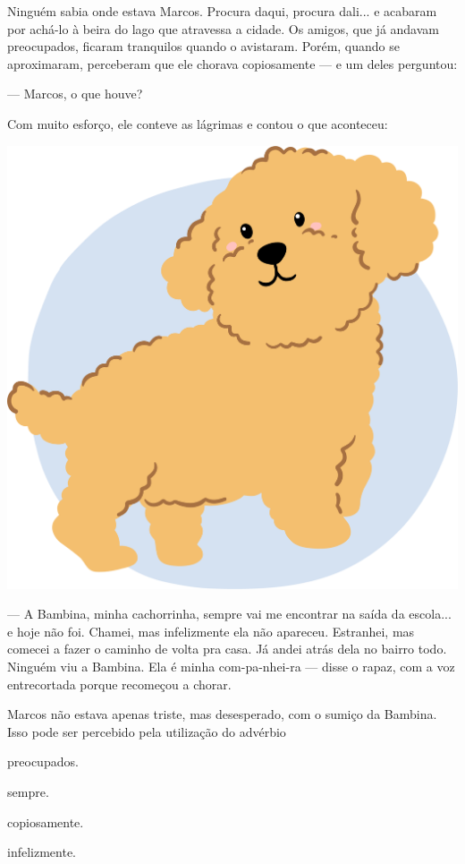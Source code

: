\begin{myquote}
Ninguém sabia onde estava Marcos. Procura daqui, procura dali... e
acabaram por achá-lo à beira do lago que atravessa a cidade. Os amigos,
que já andavam preocupados, ficaram tranquilos quando o avistaram.
Porém, quando se aproximaram, perceberam que ele chorava copiosamente
--- e um deles perguntou:

--- Marcos, o que houve?

Com muito esforço, ele conteve as lágrimas e contou o que aconteceu:

\begin{center}
\includegraphics[width=.7\textwidth]{./media/image23v.png}
\end{center}

--- A Bambina, minha cachorrinha, sempre vai me encontrar na saída da
escola... e hoje não foi. Chamei, mas infelizmente ela não apareceu.
Estranhei, mas comecei a fazer o caminho de volta pra casa. Já andei
atrás dela no bairro todo. Ninguém viu a Bambina. Ela é minha
com-pa-nhei-ra --- disse o rapaz, com a voz entrecortada porque
recomeçou a chorar.

\end{myquote}

Marcos não estava apenas triste, mas desesperado, com o sumiço da
Bambina. Isso pode ser percebido pela utilização do advérbio

\begin{escolha}
\begin{multicols}{2}
\item preocupados.

\item sempre.

\item copiosamente.

\item infelizmente.
\end{multicols}
\end{escolha}

